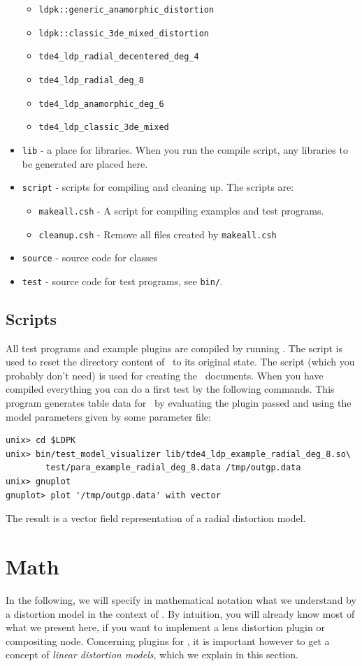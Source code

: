 \documentclass[10pt,a4paper]{article}
\begin{document}
\begin{itemize}
\begin{itemize}
\item {\tt ldpk::generic\_anamorphic\_distortion}
\item {\tt ldpk::classic\_3de\_mixed\_distortion}
\item {\tt tde4\_ldp\_radial\_decentered\_deg\_4}
\item {\tt tde4\_ldp\_radial\_deg\_8}
\item {\tt tde4\_ldp\_anamorphic\_deg\_6}
\item {\tt tde4\_ldp\_classic\_3de\_mixed}
\end{itemize}
\item {\tt lib} - a place for libraries. When you run the compile script,
any libraries to be generated are placed here.
\item {\tt script} - scripts for compiling and cleaning up.
The scripts are:
	\begin{itemize}
	\item {\tt makeall.csh} - A script for compiling examples and test programs.
	\item {\tt cleanup.csh} - Remove all files created by {\tt makeall.csh}
	\end{itemize}
\item {\tt source} - source code for classes
\item {\tt test} - source code for test programs, see {\tt bin/}.
\end{itemize}
%
\subsection{Scripts}
All test programs and example plugins are compiled
by running .
The script  is used to reset
the directory content of \ldpk\ to its original state.
The script  (which you probably don't need) is used for
creating the \doxygen\ documents. When you have compiled everything
you can do a first test by the following commands.
This program generates table data for \gnuplot\ by evaluating the plugin
passed and using the model parameters given by some parameter file:
\begin{verbatim}
unix> cd $LDPK
unix> bin/test_model_visualizer lib/tde4_ldp_example_radial_deg_8.so\
        test/para_example_radial_deg_8.data /tmp/outgp.data
unix> gnuplot
gnuplot> plot '/tmp/outgp.data' with vector
\end{verbatim}
The result is a vector field representation of a radial distortion model.
%
%
%
\section{Math}
In the following, we will specify in mathematical notation what we understand by a distortion model
in the context of \tde. By intuition, you will already know most of what we present here, if you want to implement a lens distortion
plugin or compositing node. Concerning plugins for \tde, it is important however to get a concept of
{\em linear distortion models}, which we explain in this section.
\end{document}
